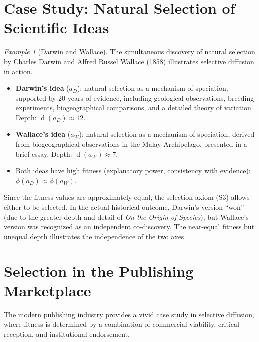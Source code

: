 \documentclass[11pt,openany]{book}
\theoremstyle{definition}
\theoremstyle{plain}
\theoremstyle{remark}
\newtheorem{example}[axiom]{Example}
\newcommand{\depth}{\operatorname{d}}       %
\begin{document}
\section{Case Study: Natural Selection of Scientific Ideas}

\begin{example}[Darwin and Wallace]
The simultaneous discovery of natural selection by Charles Darwin and Alfred Russel Wallace (1858) illustrates selective diffusion in action.
\begin{itemize}
\item \textbf{Darwin's idea} ($a_D$): natural selection as a mechanism of speciation, supported by 20 years of evidence, including geological observations, breeding experiments, biogeographical comparisons, and a detailed theory of variation. Depth: $\depth(a_D) \approx 12$.
\item \textbf{Wallace's idea} ($a_W$): natural selection as a mechanism of speciation, derived from biogeographical observations in the Malay Archipelago, presented in a brief essay. Depth: $\depth(a_W) \approx 7$.
\item Both ideas have high fitness (explanatory power, consistency with evidence): $\phi(a_D) \approx \phi(a_W)$.
\end{itemize}
Since the fitness values are approximately equal, the selection axiom (S3) allows either to be selected. In the actual historical outcome, Darwin's version ``won'' (due to the greater depth and detail of \textit{On the Origin of Species}), but Wallace's version was recognized as an independent co-discovery. The near-equal fitness but unequal depth illustrates the independence of the two axes.
\end{example}

\section{Selection in the Publishing Marketplace}

The modern publishing industry provides a vivid case study in selective diffusion, where fitness is determined by a combination of commercial viability, critical reception, and institutional endorsement.
\end{document}
